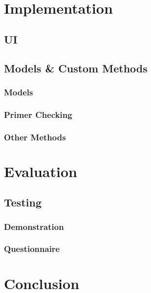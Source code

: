 \documentclass{l3proj}
\begin{document}
\chapter{Implementation}
\label{impl}

\section{UI}
\label{impl:ui}


\section{Models \& Custom Methods}
\label{impl:models}

\subsection{Models}


\subsection{Primer Checking}


\subsection{Other Methods}

\chapter{Evaluation}
\label{eval}

\section{Testing}
\label{eval:testing}

\subsection{Demonstration}
\label{eval:demo}

\subsection{Questionnaire}
\label{eval:question}

\chapter{Conclusion}
\label{conc}

\clearpage


\end{document}
